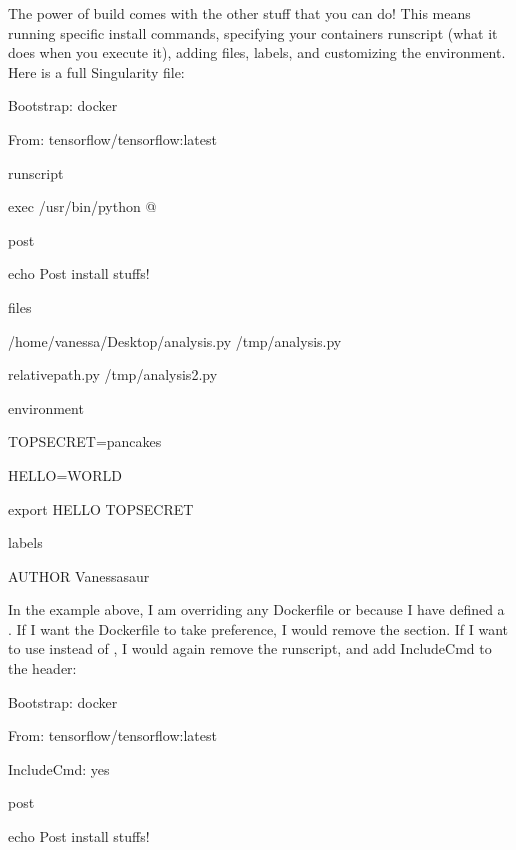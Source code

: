 \documentclass[letterpaper,10pt,english]{sphinxmanual}
\begin{document}
The power of build comes with the other stuff that you can do! This
means running specific install commands, specifying your containers
runscript (what it does when you execute it), adding files, labels, and
customizing the environment. Here is a full Singularity file:

%
\begin{sphinxVerbatim}[commandchars=\\\{\}]
Bootstrap: docker

From: tensorflow/tensorflow:latest


\PYGZpc{}runscript

    exec /usr/bin/python \PYGZdq{}\PYGZdl{}@\PYGZdq{}


\PYGZpc{}post

    echo \PYGZdq{}Post install stuffs!\PYGZdq{}


\PYGZpc{}files

/home/vanessa/Desktop/analysis.py /tmp/analysis.py

relative\PYGZus{}path.py /tmp/analysis2.py


\PYGZpc{}environment

TOPSECRET=pancakes

HELLO=WORLD

export HELLO TOPSECRET


\PYGZpc{}labels

AUTHOR Vanessasaur
\end{sphinxVerbatim}

In the example above, I am overriding any Dockerfile  or  because I have
defined a  . If I want the Dockerfile  to take preference, I would remove
the  section. If I want to use  instead of  , I would again remove the
runscript, and add IncludeCmd to the header:

%
\begin{sphinxVerbatim}[commandchars=\\\{\}]
Bootstrap: docker

From: tensorflow/tensorflow:latest

IncludeCmd: yes


\PYGZpc{}post


    echo \PYGZdq{}Post install stuffs!\PYGZdq{}
\end{sphinxVerbatim}
\end{document}

